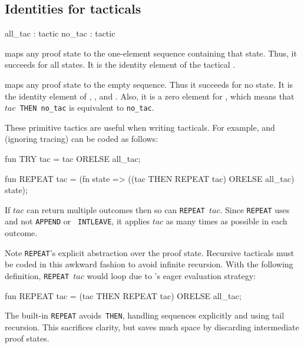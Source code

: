 \subsection{Identities for tacticals}
\begin{ttbox} 
all_tac : tactic
no_tac  : tactic
\end{ttbox}
\begin{ttdescription}
\item[\ttindexbold{all_tac}] 
maps any proof state to the one-element sequence containing that state.
Thus, it succeeds for all states.  It is the identity element of the
tactical \@.

\item[\ttindexbold{no_tac}] 
maps any proof state to the empty sequence.  Thus it succeeds for no state.
It is the identity element of , , and 
\@.  Also, it is a zero element for , which means that
\hbox{\tt$tac$ THEN no_tac} is equivalent to {\tt no_tac}.
\end{ttdescription}
These primitive tactics are useful when writing tacticals.  For example,
 and  (ignoring tracing) can be coded
as follows: 
\begin{ttbox} 
fun TRY tac = tac ORELSE all_tac;

fun REPEAT tac =
     (fn state => ((tac THEN REPEAT tac) ORELSE all_tac) state);
\end{ttbox}
If $tac$ can return multiple outcomes then so can \hbox{\tt REPEAT $tac$}.
Since {\tt REPEAT} uses  and not {\tt APPEND} or {\tt
INTLEAVE}, it applies $tac$ as many times as possible in each
outcome.

\begin{warn}
Note {\tt REPEAT}'s explicit abstraction over the proof state.  Recursive
tacticals must be coded in this awkward fashion to avoid infinite
recursion.  With the following definition, \hbox{\tt REPEAT $tac$} would
loop due to \ML's eager evaluation strategy:
\begin{ttbox} 
fun REPEAT tac = (tac THEN REPEAT tac) ORELSE all_tac;
\end{ttbox}
\par\noindent
The built-in {\tt REPEAT} avoids~{\tt THEN}, handling sequences explicitly
and using tail recursion.  This sacrifices clarity, but saves much space by
discarding intermediate proof states.
\end{warn}


